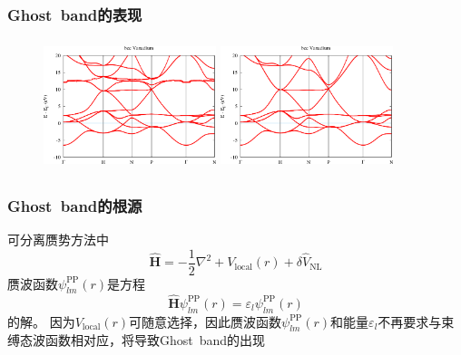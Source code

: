 {\frame
{
	\frametitle{\textrm{Ghost~band}的表现}
	\fontsize{9.2pt}{4.2pt}
\begin{figure}[h!]
\centering
\vspace*{-0.10in}
\includegraphics[height=1.50in,width=1.98in,viewport=0 0 450 320,clip]{Figures/Ghostband-Vanadium-1.png}
\includegraphics[height=1.50in,width=1.98in,viewport=0 0 450 320,clip]{Figures/Ghostband-Vanadium-4.png}
\caption{\fontsize{7.2pt}{4.2pt}}%
\label{Ghost-band}
\end{figure}
}

\frame
{
	\frametitle{\textrm{Ghost~band}的根源}
	可分离赝势方法中
	\begin{displaymath}
		\hat{\mathbf{H}}=-\dfrac12\nabla^2+V_{\mathrm{local}}(r)+\delta\hat{V}_{\mathrm{NL}}
	\end{displaymath}
	赝波函数$\psi_{lm}^{\mathrm{PP}}(r)$是方程
	\begin{displaymath}
		\hat{\mathbf{H}}\psi_{lm}^{\mathrm{PP}}(r)=\varepsilon_l\psi_{lm}^{\mathrm{PP}}(r)
	\end{displaymath}
	的解。
\vskip 15pt
	因为$V_{\mathrm{local}}(r)$可随意选择，因此赝波函数$\psi_{lm}^{\mathrm{PP}}(r)$和能量$\varepsilon_l$不再要求与束缚态波函数相对应，将导致\textrm{Ghost~band}的出现
}

}

